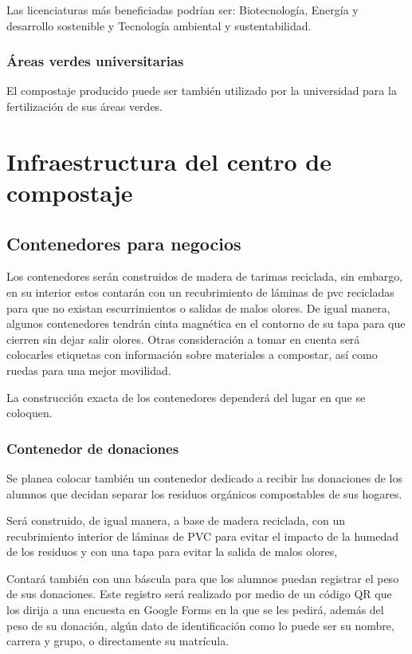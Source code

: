 Las licenciaturas más beneficiadas podrían ser: Biotecnología, Energía y desarrollo sostenible y Tecnología ambiental y sustentabilidad.

\subsubsection{Áreas verdes universitarias}

El compostaje producido puede ser también utilizado por la universidad para la fertilización de sus áreas verdes.

\section{Infraestructura del centro de compostaje}

\subsection{Contenedores para negocios}

Los contenedores serán construidos de madera de tarimas reciclada, sin embargo, en su interior estos contarán con un recubrimiento de láminas de pvc recicladas para que no existan escurrimientos o salidas de malos olores. De igual manera, algunos contenedores tendrán cinta magnética en el contorno de su tapa para que cierren sin dejar salir olores. Otras consideración a tomar en cuenta será colocarles etiquetas con información sobre materiales a compostar, así como ruedas para una mejor movilidad.

La construcción exacta de los contenedores dependerá del lugar en que se coloquen.

\subsubsection{Contenedor de donaciones}

Se planea colocar también un contenedor dedicado a recibir las donaciones de los alumnos que decidan separar los residuos orgánicos compostables de sus hogares.

Será construido, de igual manera, a base de madera reciclada, con un recubrimiento interior de láminas de PVC para evitar el impacto de la humedad de los residuos y con una tapa para evitar la salida de malos olores,

Contará también con una báscula para que los alumnos puedan registrar el peso de sus donaciones. Este registro será realizado por medio de un código QR que los dirija a una  encuesta en Google Forms en la que se les pedirá, además del peso de su donación, algún dato de identificación como lo puede ser su nombre, carrera y grupo, o directamente su matrícula.

